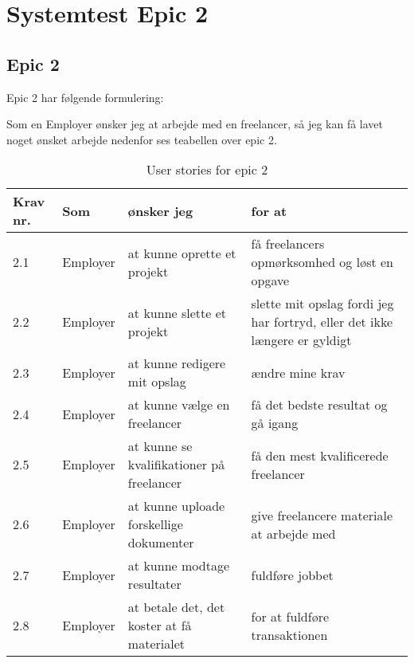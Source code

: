 
\chapter{Systemtest Epic 2}
\section{Epic 2}
Epic 2 har følgende formulering:

Som en Employer ønsker jeg at arbejde med en freelancer, så jeg kan få lavet noget ønsket arbejde
nedenfor ses teabellen over epic 2.


\begin{table}[H]
    \centering
    \caption{User stories for epic 2}
    \label{tab:us-epic2}
    \begin{tabular}{p{1cm}|p{2cm}|p{6cm}|p{6cm}}
        \textbf{Krav nr.} & \textbf{Som} & \textbf{ønsker jeg}                        & \textbf{for at}                                                                                     \\
        \hline
        2.1               & Employer     & at kunne oprette et projekt                & få freelancers opmørksomhed og løst en opgave                                                       \\
        \hline
        2.2               & Employer     & at kunne slette et projekt                 & \multicolumn{1}{p{6cm}}{slette mit opslag fordi jeg har fortryd, eller det ikke længere er gyldigt} \\
        \hline
        2.3               & Employer     & at kunne redigere mit opslag               & ændre mine krav                                                                                     \\
        \hline
        2.4               & Employer     & at kunne vælge en freelancer               & få det bedste resultat og gå igang                                                                  \\
        \hline
        2.5               & Employer     & at kunne se kvalifikationer på freelancer  & få den mest kvalificerede freelancer                                                                \\
        \hline
        2.6               & Employer     & at kunne uploade forskellige dokumenter    & give freelancere materiale at arbejde med                                                           \\
        \hline
        2.7               & Employer     & at kunne modtage resultater                & fuldføre jobbet                                                                                     \\
        \hline
        2.8               & Employer     & at betale det, det koster at få materialet & for at fuldføre transaktionen                                                                       \\
    \end{tabular}
\end{table}


